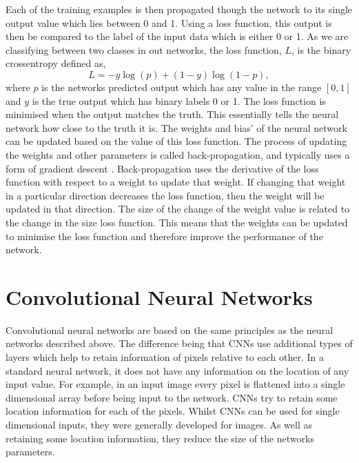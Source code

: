 %
Each of the training examples is then propagated though the network to its single output value which lies between 0 and 1. Using a loss function, this output is then be compared to
the label of the input data which is either 0 or 1. As we are classifying
between two classes in out networks, the loss function, $L$, is the binary
crossentropy defined as,
%
\begin{equation}\label{cnn:loss} 
L = -y\log{(p)} + (1-y)\log{(1-p)},
\end{equation}
%
where $p$ is the networks predicted output which has any value in the range $[0,1]$ and $y$ is the true output which has binary labels 0 or 1. 
The loss function is minimised when the output matches the truth. This essentially
tells the neural network how close to the truth it is. The weights and bias' of
the neural network can be updated based on the value of this loss function. The
process of updating the weights and other parameters is called back-propagation,
and typically uses a form of gradient descent
\cite{kingma2015AdamMethod}.
Back-propagation uses the derivative of the loss function with respect to a weight to update that weight.
If changing that weight in a particular direction decreases the loss function, then the weight will be updated in that direction.
The size of the change of the weight value is related to the change in the size loss function.
This means that the weights can be updated to minimise the loss function and therefore improve the performance of the network.



\section{Convolutional Neural Networks}

Convolutional neural networks are based on the same principles as the neural networks described above. 
The difference being that \acp{CNN} use additional types of layers which help to retain information of pixels relative to each other.
In a standard neural network, it does not have any information on the location of any input value.
For example, in an input image every pixel is flattened into a single dimensional array before being input to the network.
\acp{CNN} try to retain some location information for each of the pixels.
Whilst \acp{CNN} can be used for single dimensional inputs, they were generally developed for images.
As well as retaining some location information, they reduce the size of the networks parameters.


